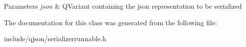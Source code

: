 \begin{DoxyParams}{\-Parameters}
{\em json} & \-Q\-Variant containing the json representation to be serialized \\
\hline
\end{DoxyParams}


\-The documentation for this class was generated from the following file\-:\begin{DoxyCompactItemize}
\item 
include/qjson/serializerrunnable.\-h\end{DoxyCompactItemize}

